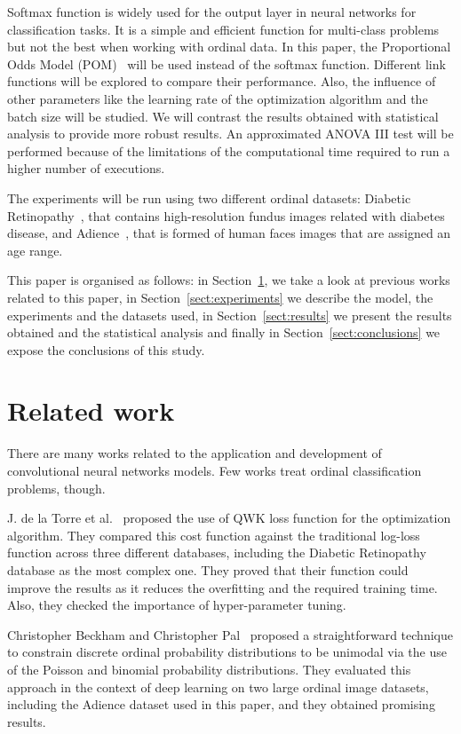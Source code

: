\documentclass[journal]{IEEEtran}
\begin{document}
	Softmax function is widely used for the output layer in neural networks for classification tasks. It is a simple and efficient function for multi-class problems but not the best when working with ordinal data. In this paper, the Proportional Odds Model (POM)~\cite{gutierrez2016ordinal, agresti2010analysis} will be used instead of the softmax function. Different link functions will be explored to compare their performance. Also, the influence of other parameters like the learning rate of the optimization algorithm and the batch size will be studied. We will contrast the results obtained with statistical analysis to provide more robust results. An approximated ANOVA III test will be performed because of the limitations of the computational time required to run a higher number of executions.
	
	The experiments will be run using two different ordinal datasets: Diabetic Retinopathy~\cite{de2018weighted}, that contains high-resolution fundus images related with diabetes disease, and Adience~\cite{beckham2017unimodal}, that is formed of human faces images that are assigned an age range.
	
	This paper is organised as follows: in Section~\ref{sect:relatedwork}, we take a look at previous works related to this paper, in Section~\ref{sect:experiments} we describe the model, the experiments and the datasets used, in Section~\ref{sect:results} we present the results obtained and the statistical analysis and finally in Section~\ref{sect:conclusions} we expose the conclusions of this study.
	
	\section{Related work}
	\label{sect:relatedwork}
	There are many works related to the application and development of convolutional neural networks models. Few works treat ordinal classification problems, though.
	
	J. de la Torre et al.~\cite{de2018weighted} proposed the use of QWK loss function for the optimization algorithm. They compared this cost function against the traditional log-loss function across three different databases, including the Diabetic Retinopathy database as the most complex one. They proved that their function could improve the results as it reduces the overfitting and the required training time. Also, they checked the importance of hyper-parameter tuning.
	
	Christopher Beckham and Christopher Pal~\cite{beckham2017unimodal} proposed a straightforward technique to constrain discrete ordinal probability distributions to be unimodal via the use of the Poisson and binomial probability distributions. They evaluated this approach in the context of deep learning on two large ordinal image datasets, including the Adience dataset used in this paper, and they obtained promising results.
	
\end{document}
